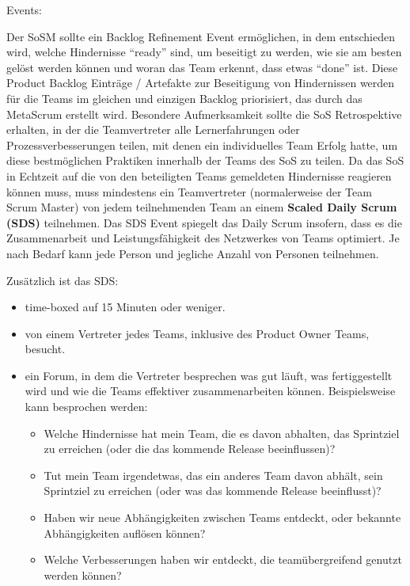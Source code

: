 \documentclass[12pt,a4paper,parskip=full]{scrartcl}
\begin{document}
Events:

Der SoSM sollte ein Backlog Refinement Event ermöglichen, in dem entschieden wird, welche Hindernisse ``ready'' sind, um beseitigt zu werden, wie sie am besten gelöst werden können und woran das Team erkennt, dass etwas ``done'' ist. Diese Product Backlog Einträge / Artefakte zur Beseitigung von Hindernissen werden für die Teams im gleichen und einzigen Backlog priorisiert, das durch das MetaScrum erstellt wird.
Besondere Aufmerksamkeit sollte die SoS Retrospektive erhalten, in der die Teamvertreter alle Lernerfahrungen oder Prozessverbesserungen teilen, mit denen ein individuelles Team Erfolg hatte, um diese bestmöglichen Praktiken innerhalb der Teams des SoS zu teilen.
Da das SoS in Echtzeit auf die von den beteiligten Teams gemeldeten Hindernisse reagieren können muss, muss mindestens ein Teamvertreter (normalerweise der Team Scrum Master) von jedem teilnehmenden Team an einem \textbf{Scaled Daily Scrum (SDS)} teilnehmen. Das SDS Event spiegelt das Daily Scrum insofern, dass es die Zusammenarbeit und Leistungsfähigkeit des Netzwerkes von Teams optimiert. Je nach Bedarf kann jede Person und jegliche Anzahl von Personen teilnehmen.

Zusätzlich ist das SDS:

\begin{itemize}
\item time-boxed auf 15 Minuten oder weniger.
\item von einem Vertreter jedes Teams, inklusive des Product Owner Teams, besucht.
\item ein Forum, in dem die Vertreter besprechen was gut läuft, was fertiggestellt wird und wie die Teams effektiver zusammenarbeiten können. Beispielsweise kann besprochen werden:
\begin{itemize}
\item Welche Hindernisse hat mein Team, die es davon abhalten, das Sprintziel zu erreichen (oder die das kommende Release beeinflussen)?
\item Tut mein Team irgendetwas, das ein anderes Team davon abhält, sein Sprintziel zu erreichen (oder was das kommende Release beeinflusst)?
\item Haben wir neue Abhängigkeiten zwischen Teams entdeckt, oder bekannte Abhängigkeiten auflösen können?
\item Welche Verbesserungen haben wir entdeckt, die teamübergreifend genutzt werden können?
\end{itemize}
\end{itemize}
\end{document}
